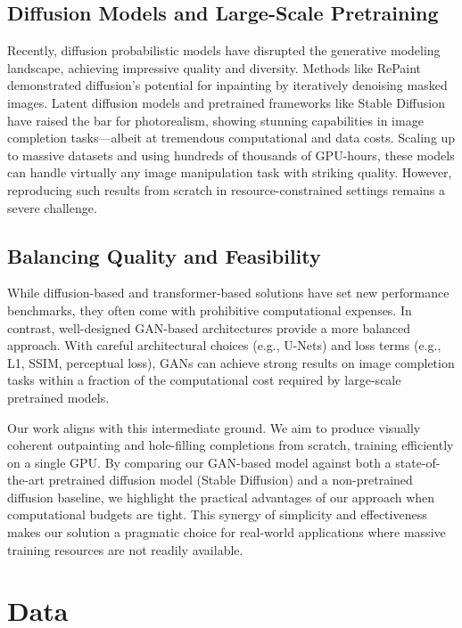\documentclass[sigconf]{acmart}
\begin{document}
\subsection*{Diffusion Models and Large-Scale Pretraining}
Recently, diffusion probabilistic models \cite{SohlDickstein2015,Ho2020} have disrupted the generative modeling landscape, achieving impressive quality and diversity. Methods like RePaint \cite{Lugmayr2022} demonstrated diffusion's potential for inpainting by iteratively denoising masked images. Latent diffusion models \cite{Rombach2022} and pretrained frameworks like Stable Diffusion have raised the bar for photorealism, showing stunning capabilities in image completion tasks—albeit at tremendous computational and data costs. Scaling up to massive datasets and using hundreds of thousands of GPU-hours, these models can handle virtually any image manipulation task with striking quality. However, reproducing such results from scratch in resource-constrained settings remains a severe challenge.

\subsection*{Balancing Quality and Feasibility}
While diffusion-based and transformer-based solutions have set new performance benchmarks, they often come with prohibitive computational expenses. In contrast, well-designed GAN-based architectures provide a more balanced approach. With careful architectural choices (e.g., U-Nets) and loss terms (e.g., L1, SSIM, perceptual loss), GANs can achieve strong results on image completion tasks within a fraction of the computational cost required by large-scale pretrained models.

Our work aligns with this intermediate ground. We aim to produce visually coherent outpainting and hole-filling completions from scratch, training efficiently on a single GPU. By comparing our GAN-based model against both a state-of-the-art pretrained diffusion model (Stable Diffusion) and a non-pretrained diffusion baseline, we highlight the practical advantages of our approach when computational budgets are tight. This synergy of simplicity and effectiveness makes our solution a pragmatic choice for real-world applications where massive training resources are not readily available.

\section{Data}
\end{document}
